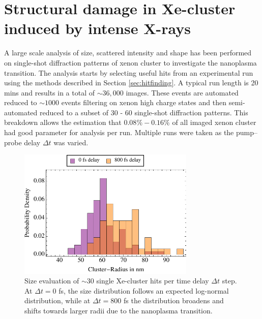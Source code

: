\section{Structural damage in Xe-cluster induced by intense X-rays}\label{sec:xenon-data}
A large scale analysis of size, scattered intensity and shape has been performed on single-shot diffraction patterns of xenon cluster to investigate the nanoplasma transition. The analysis starts by selecting useful hits from an experimental run using the methods described in Section \ref{sec:hitfinding}. A typical run length is 20 mins and results in a total of $\sim 36,000$ images. These events are automated reduced to $\sim 1000$ events filtering on xenon high charge states and then semi-automated reduced to a subset of 30 - 60 single-shot diffraction patterns. This breakdown allows the estimation that $0.08\% - 0.16\%$ of all imaged xenon cluster had good parameter for analysis per run. Multiple runs were taken as the pump--probe delay $\Delta t$ was varied.\\
\begin{figure}
	\centering
		\includegraphics[width=0.75\textwidth]{images/size-distributions.pdf}
	\caption[Single Xe-cluster size distribution at varying time delay $\Delta t$.]{Size evaluation of $\sim 30$ single Xe-cluster hits per time delay $\Delta t$ step. At $\Delta t=0$ fs, the size distribution follows an expected log-normal distribution, while at $\Delta t=800$ fs the distribution broadens and shifts towards larger radii due to the nanoplasma transition.}
	\label{fig:size-distributions}
\end{figure}

